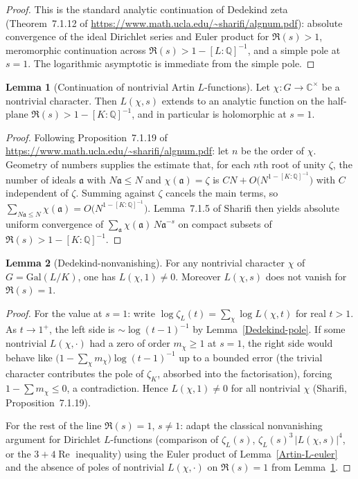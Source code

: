 \documentclass[10pt,a4paper]{article}
\newcommand{\uses}[1]{}
\theoremstyle{definition}
\newtheorem{lemma}{Lemma}[section]
\begin{document}
\begin{proof}
This is the standard analytic continuation of Dedekind zeta (Theorem~7.1.12 of
\url{https://www.math.ucla.edu/~sharifi/algnum.pdf}): absolute convergence of the ideal
Dirichlet series and Euler product for $\Re(s)>1$, meromorphic continuation across
$\Re(s)>1-[L:\mathbb{Q}]^{-1}$, and a simple pole at $s=1$.  The logarithmic asymptotic is
immediate from the simple pole.
\end{proof}
\begin{lemma}[Continuation of nontrivial Artin $L$-functions]\label{Artin-L-continuation}
Let $\chi : G \to \mathbb{C}^\times$ be a nontrivial character.  Then $L(\chi,s)$ extends to an
analytic function on the half-plane $\Re(s) > 1 - [K:\mathbb{Q}]^{-1}$, and in particular is
holomorphic at $s=1$.
\end{lemma}
\begin{proof}
Following Proposition~7.1.19 of \url{https://www.math.ucla.edu/~sharifi/algnum.pdf}: let $n$
be the order of $\chi$.  Geometry of numbers supplies the estimate that, for each $n$th root of
unity $\zeta$, the number of ideals $\mathfrak{a}$ with $N\mathfrak{a} \leq N$ and
$\chi(\mathfrak{a})=\zeta$ is $CN + O\bigl(N^{1-[K:\mathbb{Q}]^{-1}}\bigr)$ with $C$ independent of
$\zeta$.  Summing against $\zeta$ cancels the main terms, so
$\sum_{N\mathfrak{a}\leq N} \chi(\mathfrak{a}) = O\bigl(N^{1-[K:\mathbb{Q}]^{-1}}\bigr)$.
Lemma~7.1.5 of Sharifi then yields absolute uniform convergence of
$\sum_{\mathfrak{a}} \chi(\mathfrak{a})\, N\mathfrak{a}^{-s}$ on compact subsets of
$\Re(s) > 1 - [K:\mathbb{Q}]^{-1}$.
\end{proof}
\begin{lemma}[Dedekind-nonvanishing]\label{Dedekind-nonvanishing}
For any nontrivial character $\chi$ of $G = \mathrm{Gal}(L/K)$, one has $L(\chi,1) \neq 0$.
Moreover $L(\chi,s)$ does not vanish for $\Re(s)=1$.
\end{lemma}
\begin{proof}\uses{Dedekind-factor, Dedekind-pole, Artin-L-continuation}
For the value at $s=1$: write $\log\zeta_L(t) = \sum_\chi \log L(\chi,t)$ for real $t>1$.
As $t\to 1^+$, the left side is $\sim \log(t-1)^{-1}$ by Lemma~\ref{Dedekind-pole}.  If some
nontrivial $L(\chi,\cdot)$ had a zero of order $m_\chi \geq 1$ at $s=1$, the right side would
behave like $\bigl(1 - \sum_\chi m_\chi\bigr)\log(t-1)^{-1}$ up to a bounded error
(the trivial character contributes the pole of $\zeta_K$, absorbed into the factorisation),
forcing $1-\sum m_\chi \leq 0$, a contradiction.  Hence $L(\chi,1)\neq 0$ for all nontrivial
$\chi$ (Sharifi, Proposition~7.1.19).

For the rest of the line $\Re(s)=1$, $s\neq 1$: adapt the classical nonvanishing argument for
Dirichlet $L$-functions (comparison of $\zeta_L(s)$, $\zeta_L(s)^3\,|L(\chi,s)|^4$, or the
$3+4\operatorname{Re}$ inequality) using the Euler product of Lemma~\ref{Artin-L-euler} and the
absence of poles of nontrivial $L(\chi,\cdot)$ on $\Re(s)=1$ from
Lemma~\ref{Artin-L-continuation}.
\end{proof}
\end{document}
